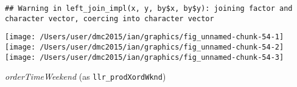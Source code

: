 \documentclass[10pt]{report}
\newenvironment{Shaded}{}{}
\newcommand{\KeywordTok}[1]{\textcolor[rgb]{0.00,0.44,0.13}{\textbf{{#1}}}}
\newcommand{\DataTypeTok}[1]{\textcolor[rgb]{0.56,0.13,0.00}{{#1}}}
\newcommand{\StringTok}[1]{\textcolor[rgb]{0.25,0.44,0.63}{{#1}}}
\newcommand{\NormalTok}[1]{{#1}}
\begin{document}
\begin{Shaded}
\end{Shaded}

\begin{verbatim}
## Warning in left_join_impl(x, y, by$x, by$y): joining factor and character vector, coercing into character vector
\end{verbatim}

\begin{Shaded}
\end{Shaded}

\begin{center}\texttt{[image: /Users/user/dmc2015/ian/graphics/fig\_unnamed-chunk-54-1]} \texttt{[image: /Users/user/dmc2015/ian/graphics/fig\_unnamed-chunk-54-2]} \texttt{[image: /Users/user/dmc2015/ian/graphics/fig\_unnamed-chunk-54-3]} \end{center}

\emph{orderTimeWeekend} (as \texttt{llr\_prodXordWknd})
\end{document}
